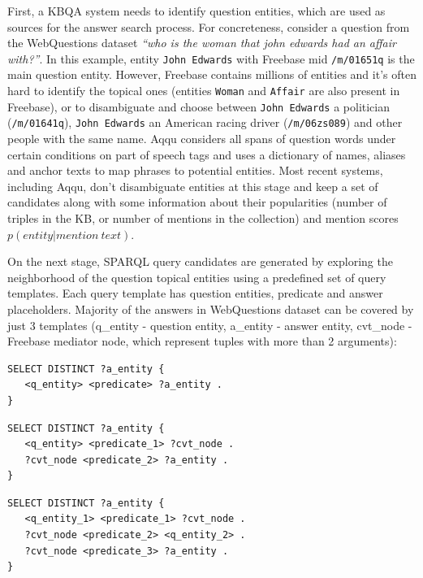 First, a KBQA system needs to identify question entities, which are used as sources for the answer search process.
For concreteness, consider a question from the WebQuestions dataset \textit{``who is the woman that john edwards had an affair with?''}.
In this example, entity \texttt{John Edwards} with Freebase mid \texttt{/m/01651q} is the main question entity.
However, Freebase contains millions of entities and it's often hard to identify the topical ones (\eg entities \texttt{Woman} and \texttt{Affair} are also present in Freebase), or to disambiguate and choose between \texttt{John Edwards} a politician (\texttt{/m/01641q}), \texttt{John Edwards} an American racing driver (\texttt{/m/06zs089}) and other people with the same name.
Aqqu considers all spans of question words under certain conditions on part of speech tags and uses a dictionary of names, aliases and anchor texts \cite{SPITKOVSKY12.266} to map phrases to potential entities.
Most recent systems, including Aqqu, don't disambiguate entities at this stage and keep a set of candidates along with some information about their popularities (number of triples in the KB, or number of mentions in the collection) and mention scores $p(entity| mention\ text)$.

On the next stage, SPARQL query candidates are generated by exploring the neighborhood of the question topical entities using a predefined set of query templates.
Each query template has question entities, predicate and answer placeholders.
Majority of the answers in WebQuestions dataset can be covered by just 3 templates (q\_entity - question entity, a\_entity - answer entity, cvt\_node - Freebase mediator node, which represent tuples with more than 2 arguments):

\begin{lstlisting}[frame=single,basicstyle=\small]
SELECT DISTINCT ?a_entity {
   <q_entity> <predicate> ?a_entity .
}
\end{lstlisting}

\vspace{-0.25cm}
\begin{lstlisting}[frame=single,basicstyle=\small]
SELECT DISTINCT ?a_entity {
   <q_entity> <predicate_1> ?cvt_node .
   ?cvt_node <predicate_2> ?a_entity .
}
\end{lstlisting}

\vspace{-0.25cm}
\begin{lstlisting}[frame=single,basicstyle=\small]
SELECT DISTINCT ?a_entity {
   <q_entity_1> <predicate_1> ?cvt_node .
   ?cvt_node <predicate_2> <q_entity_2> .
   ?cvt_node <predicate_3> ?a_entity .
}
\end{lstlisting}

